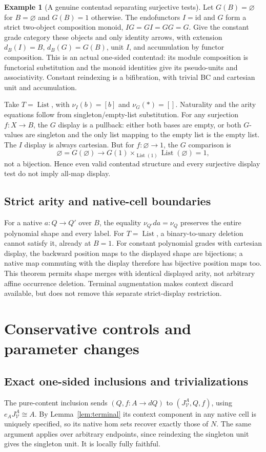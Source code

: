 \documentclass[11pt,a4paper]{article}
\theoremstyle{definition}
\newtheorem{example}[theorem]{Example}
\newcommand{\V}{\mathcal V}
\newcommand{\id}{\mathrm{id}}
\newcommand{\List}{\operatorname{List}}
\begin{document}
\begin{example}[A genuine contentad separating surjective tests]
Let $G(B)=\varnothing$ for $B=\varnothing$ and $G(B)=1$ otherwise.
The endofunctors $I=\id$ and $G$ form a strict two-object composition monoid,
$IG=GI=GG=G$. Give the constant grade category these objects and only identity
arrows, with extension $d_B(I)=B$, $d_B(G)=G(B)$, unit $I$, and accumulation
by functor composition. This is an actual one-sided contentad: its module
composition is functorial substitution and the monoid identities give its
pseudo-units and associativity. Constant reindexing is a bifibration, with
trivial BC and cartesian unit and accumulation.

Take $T=\List$, with $\nu_I(b)=[b]$ and $\nu_G(*)=[]$. Naturality and the
arity equations follow from singleton/empty-list substitution. For any
surjection $f:X\to B$, the $G$ display is a pullback: either both bases are
empty, or both $G$-values are singleton and the only list mapping to the empty
list is the empty list. The $I$ display is always cartesian. But for
$f:\varnothing\to1$, the $G$ comparison is
\[
 \varnothing=G(\varnothing)\longrightarrow
 G(1)\times_{\List(1)}\List(\varnothing)=1,
\]
not a bijection. Hence even valid contentad structure and every surjective
display test do not imply all-map display.
\end{example}

\subsection{Strict arity and native-cell boundaries}
For a native $a:Q\to Q'$ over $B$, the equality
$\nu_{Q'}da=\nu_Q$ preserves the entire polynomial shape and every label.
For $T=\List$, a binary-to-unary deletion cannot satisfy it, already at $B=1$.
For constant polynomial grades with cartesian display, the backward position
maps to the displayed shape are bijections; a native map commuting with the
display therefore has bijective position maps too. This theorem permits shape
merges with identical displayed arity, not arbitrary affine occurrence
deletion. Terminal augmentation makes context discard available, but does not
remove this separate strict-display restriction.

\section{Conservative controls and parameter changes}\label{sec:controls}

\subsection{Exact one-sided inclusions and trivializations}
The pure-content inclusion sends $(Q,f:A\to dQ)$ to
$(J_\V^A,Q,f)$, using $e_AJ_\V^A\cong A$. By
Lemma~\ref{lem:terminal} its context component in any native cell is uniquely
specified, so its native hom sets recover exactly those of $N$. The same
argument applies over arbitrary endpoints, since reindexing the singleton
unit gives the singleton unit. It is locally fully faithful.
\end{document}
